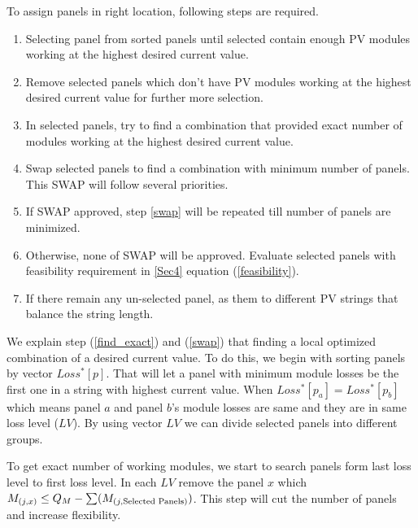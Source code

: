 \documentclass[conference]{IEEEtran}
\begin{document}
To assign panels in right location, following steps are required.
\begin{enumerate}[(1)]
\item Selecting panel from sorted panels until selected contain enough PV modules working at the highest desired current value.
\item Remove selected panels which don't have PV modules working at the highest desired current value for further more selection.
\item In selected panels, try to find a combination that provided exact number of modules working at the highest desired current value.\label{find_exact}
\item Swap selected panels to find a combination with minimum number of panels. This SWAP will follow several priorities.\label{swap}
\item If SWAP approved, step \ref{swap} will be repeated till number of panels are minimized.
\item Otherwise, none of SWAP will be approved. Evaluate selected panels with feasibility requirement in \ref{Sec4} equation (\ref{feasibility}).
\item If there remain any un-selected panel, as them to different PV strings that balance the string length.
\end{enumerate}

We explain step (\ref{find_exact}) and (\ref{swap}) that finding a local optimized combination of a desired current value. To do this, we begin with sorting panels by vector $Loss^*[p]$. That will let a panel with minimum module losses be the first one in a string with highest current value. When $Loss^*[p_a] = Loss^*[p_b]$ which means panel $a$ and panel $b$'s module losses are same and they are in same loss level ($LV$). By using vector $LV$ we can divide selected panels into different groups.

To get exact number of working modules, we start to search panels form last loss level to first loss level. In each $LV$ remove the panel $x$ which $M_{(j,x)} \leq Q_M - \sum (M_{(j,\textup{Selected Panels})})$. This step will cut the number of panels and increase flexibility.
\end{document}
